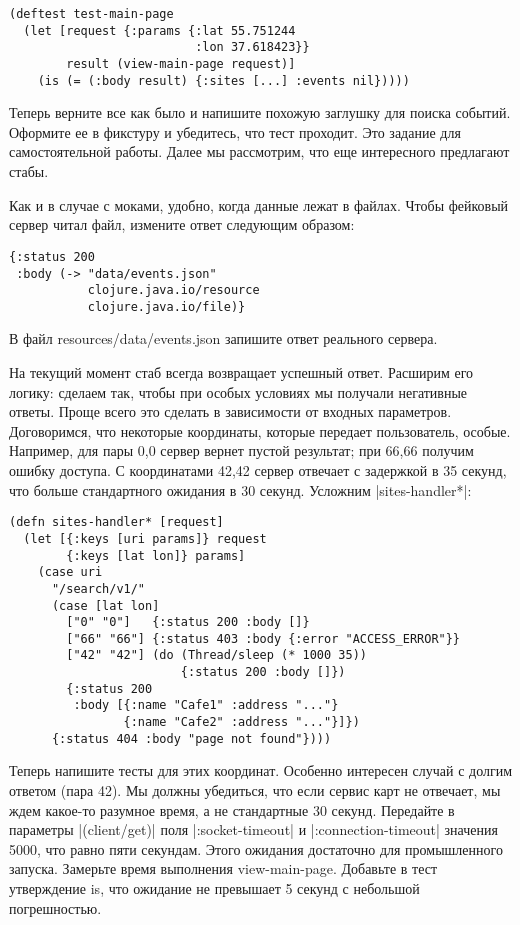 \begin{verbatim}
(deftest test-main-page
  (let [request {:params {:lat 55.751244
                          :lon 37.618423}}
        result (view-main-page request)]
    (is (= (:body result) {:sites [...] :events nil}))))
\end{verbatim}

Теперь верните все как было и напишите похожую заглушку для поиска
событий. Оформите ее в фикстуру и убедитесь, что тест проходит. Это задание для
самостоятельной работы. Далее мы рассмотрим, что еще интересного предлагают
стабы.

Как и в случае с моками, удобно, когда данные лежат в файлах. Чтобы фейковый
сервер читал файл, измените ответ следующим образом:

\begin{verbatim}
{:status 200
 :body (-> "data/events.json"
           clojure.java.io/resource
           clojure.java.io/file)}
\end{verbatim}

В файл resources/data/events.json запишите ответ реального сервера.

На текущий момент стаб всегда возвращает успешный ответ. Расширим его логику:
сделаем так, чтобы при особых условиях мы получали негативные ответы. Проще
всего это сделать в зависимости от входных параметров. Договоримся, что
некоторые координаты, которые передает пользователь, особые. Например, для пары
0,0 сервер вернет пустой результат; при 66,66 получим ошибку доступа. С
координатами 42,42 сервер отвечает с задержкой в 35 секунд, что больше
стандартного ожидания в 30 секунд. Усложним \spverb|sites-handler*|:

\begin{verbatim}
(defn sites-handler* [request]
  (let [{:keys [uri params]} request
        {:keys [lat lon]} params]
    (case uri
      "/search/v1/"
      (case [lat lon]
        ["0" "0"]   {:status 200 :body []}
        ["66" "66"] {:status 403 :body {:error "ACCESS_ERROR"}}
        ["42" "42"] (do (Thread/sleep (* 1000 35))
                        {:status 200 :body []})
        {:status 200
         :body [{:name "Cafe1" :address "..."}
                {:name "Cafe2" :address "..."}]})
      {:status 404 :body "page not found"})))
\end{verbatim}

Теперь напишите тесты для этих координат. Особенно интересен случай с долгим
ответом (пара 42). Мы должны убедиться, что если сервис карт не отвечает, мы
ждем какое-то разумное время, а не стандартные 30 секунд. Передайте в параметры
\spverb|(client/get)| поля \spverb|:socket-timeout| и \spverb|:connection-timeout| значения 5000, что
равно пяти секундам. Этого ожидания достаточно для промышленного
запуска. Замерьте время выполнения view-main-page. Добавьте в тест утверждение
is, что ожидание не превышает 5 секунд с небольшой погрешностью.

